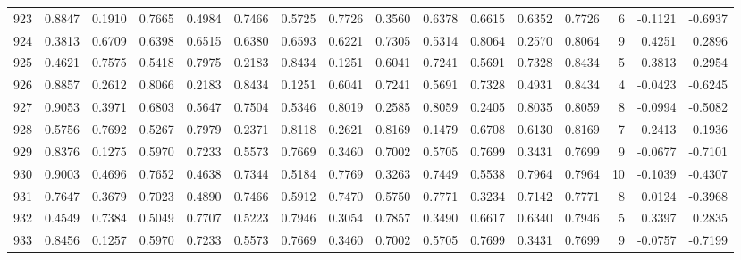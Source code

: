 \begin{tabular}{lrrrrrrrrrrrrrrr}
923 &      0.8847 &  0.1910 &  0.7665 &  0.4984 &  0.7466 &  0.5725 &  0.7726 &  0.3560 &  0.6378 &  0.6615 &   0.6352 &     0.7726 &      6 &                   -0.1121 &                    -0.6937 \\
924 &      0.3813 &  0.6709 &  0.6398 &  0.6515 &  0.6380 &  0.6593 &  0.6221 &  0.7305 &  0.5314 &  0.8064 &   0.2570 &     0.8064 &      9 &                    0.4251 &                     0.2896 \\
925 &      0.4621 &  0.7575 &  0.5418 &  0.7975 &  0.2183 &  0.8434 &  0.1251 &  0.6041 &  0.7241 &  0.5691 &   0.7328 &     0.8434 &      5 &                    0.3813 &                     0.2954 \\
926 &      0.8857 &  0.2612 &  0.8066 &  0.2183 &  0.8434 &  0.1251 &  0.6041 &  0.7241 &  0.5691 &  0.7328 &   0.4931 &     0.8434 &      4 &                   -0.0423 &                    -0.6245 \\
927 &      0.9053 &  0.3971 &  0.6803 &  0.5647 &  0.7504 &  0.5346 &  0.8019 &  0.2585 &  0.8059 &  0.2405 &   0.8035 &     0.8059 &      8 &                   -0.0994 &                    -0.5082 \\
928 &      0.5756 &  0.7692 &  0.5267 &  0.7979 &  0.2371 &  0.8118 &  0.2621 &  0.8169 &  0.1479 &  0.6708 &   0.6130 &     0.8169 &      7 &                    0.2413 &                     0.1936 \\
929 &      0.8376 &  0.1275 &  0.5970 &  0.7233 &  0.5573 &  0.7669 &  0.3460 &  0.7002 &  0.5705 &  0.7699 &   0.3431 &     0.7699 &      9 &                   -0.0677 &                    -0.7101 \\
930 &      0.9003 &  0.4696 &  0.7652 &  0.4638 &  0.7344 &  0.5184 &  0.7769 &  0.3263 &  0.7449 &  0.5538 &   0.7964 &     0.7964 &     10 &                   -0.1039 &                    -0.4307 \\
931 &      0.7647 &  0.3679 &  0.7023 &  0.4890 &  0.7466 &  0.5912 &  0.7470 &  0.5750 &  0.7771 &  0.3234 &   0.7142 &     0.7771 &      8 &                    0.0124 &                    -0.3968 \\
932 &      0.4549 &  0.7384 &  0.5049 &  0.7707 &  0.5223 &  0.7946 &  0.3054 &  0.7857 &  0.3490 &  0.6617 &   0.6340 &     0.7946 &      5 &                    0.3397 &                     0.2835 \\
933 &      0.8456 &  0.1257 &  0.5970 &  0.7233 &  0.5573 &  0.7669 &  0.3460 &  0.7002 &  0.5705 &  0.7699 &   0.3431 &     0.7699 &      9 &                   -0.0757 &                    -0.7199 \\

\end{tabular}
